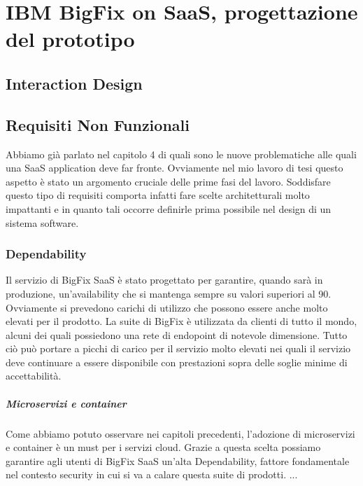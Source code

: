 \chapter{IBM BigFix on SaaS, progettazione del prototipo}

\section{Interaction Design}

\section{Requisiti Non Funzionali}
Abbiamo già parlato nel capitolo 4 di quali sono le nuove problematiche alle quali una SaaS application deve far fronte. Ovviamente nel mio lavoro di tesi questo aspetto è stato un argomento cruciale delle prime fasi del lavoro. Soddisfare questo tipo di requisiti comporta infatti fare scelte architetturali molto impattanti e in quanto tali occorre definirle prima possibile nel design di un sistema software. 
\subsection{Dependability}
	
	
	
	

Il servizio di BigFix SaaS è stato progettato per garantire, quando sarà in produzione, un'availability che si mantenga sempre su valori superiori al 90. Ovviamente si prevedono carichi di utilizzo che possono essere anche molto elevati per il prodotto. La suite di BigFix è utilizzata da clienti di tutto il mondo, alcuni dei quali possiedono una rete di endopoint di notevole dimensione. Tutto ciò può portare a picchi di carico per il servizio molto elevati nei quali il servizio deve continuare a essere disponibile con prestazioni sopra delle soglie minime di accettabilità.

\paragraph{Microservizi e container}
Come abbiamo potuto osservare nei capitoli precedenti, l'adozione di microservizi e container è un must per i servizi cloud. Grazie a questa scelta possiamo garantire agli utenti di BigFix SaaS un'alta Dependability, fattore fondamentale nel contesto security in cui si va a calare questa suite di prodotti. ...


